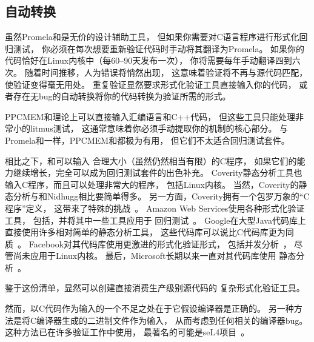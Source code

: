 \subsection{自动转换}
\label{sec:future:Automatic Translation}

虽然Promela和是无价的设计辅助工具，
但如果你需要对C语言程序进行形式化回归测试，
你必须在每次想要重新验证代码时手动将其翻译为Promela。
如果你的代码恰好在Linux内核中（每60--90天发布一次），
你将需要每年手动翻译四到六次。
随着时间推移，人为错误将悄然出现，
这意味着验证将不再与源代码匹配，使验证变得毫无用处。
重复验证显然要求形式化验证工具直接输入你的代码，
或者存在无bug的自动转换将你的代码转换为验证所需的形式。

PPCMEM和理论上可以直接输入汇编语言和C++代码，
但这些工具只能处理非常小的litmus测试，
这通常意味着你必须手动提取你的机制的核心部分。
与Promela和一样，PPCMEM和都极为有用，
但它们不太适合回归测试套件。

相比之下，和可以输入
合理大小（虽然仍然相当有限）的C程序，
如果它们的能力继续增长，完全可以成为回归测试套件的出色补充。
Coverity静态分析工具也输入C程序，而且可以处理非常大的程序，
包括Linux内核。
当然，Coverity的静态分析与和Nidhugg相比要简单得多。
另一方面，Coverity拥有一个包罗万象的``C程序''定义，
这带来了特殊的挑战~\cite{AlBessey2010BillionLoCLater}。
Amazon Web Services使用各种形式化验证工具，
包括，并将其中一些工具应用于
回归测试~\cite{ByronCook2018FormalAmazon}。
Google在大型Java代码库上直接使用许多相对简单的静态分析工具，
这些代码库可以说比C代码库更为同质~\cite{CaitlinSadowski2018staticAnalysisGoogle}。
Facebook对其代码库使用更激进的形式化验证形式，
包括并发分析~\cite{DinoDistefano2019FBstaticAnalysis,PeterWOHearn2019incorrectnessLogic}，
尽管尚未应用于Linux内核。
最后，Microsoft长期以来一直对其代码库使用
静态分析~\cite{JamesRLarus2004RightingSoftware}。

鉴于这份清单，显然可以创建直接消费生产级别源代码的
复杂形式化验证工具。

然而，以C代码作为输入的一个不足之处在于它假设编译器是正确的。
另一种方法是将C编译器生成的二进制文件作为输入，
从而考虑到任何相关的编译器bug。
这种方法已在许多验证工作中使用，
最著名的可能是seL4项目~\cite{ThomasSewell2013L4binaryVerification}。

\QuickQuizEnd

